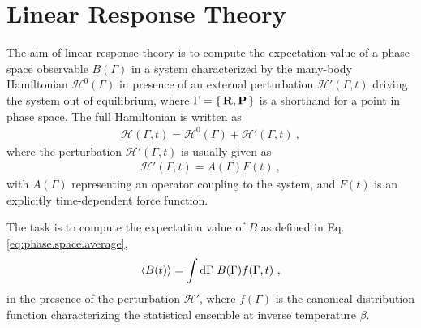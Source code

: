 \section{Linear Response Theory}
The aim of linear response theory is to compute the expectation value of a phase-space observable $B (\Gamma)$ in a system characterized by the many-body Hamiltonian $\mathcal H^0 (\Gamma)$ in presence of an external perturbation $\mathcal H' (\Gamma, t)$ driving the system out of equilibrium, where $\Gamma = \set{{\bf R}, {\bf P}}$ is a shorthand for a point in phase space.
The full Hamiltonian is written as
\begin{align}
  \mathcal H (\Gamma, t)
   = \mathcal H^0 (\Gamma) + \mathcal H' (\Gamma, t)~,
  \label{eq:lr.H}
\end{align}
where the perturbation $\mathcal H' (\Gamma, t)$ is usually given as
%
\begin{align}
  \mathcal H' (\Gamma, t)= A (\Gamma) F(t)~,
  \label{eq:lr.H_AF}
\end{align}
%
with $A(\Gamma)$ representing an operator coupling to the system, and $F(t)$ is an explicitly time-dependent force function.

The task is to compute the expectation value of $B$ as defined in Eq.\,\eqref{eq:phase.space.average},
%
\begin{align}
  \braket{B (t)}
    = \int \d \Gamma ~ B (\Gamma) f(\Gamma, t)~,
  \label{eq:lr.B.1}
\end{align}
%
in the presence of the perturbation $\mathcal H'$, where $f (\Gamma)$ is the canonical distribution function characterizing the statistical ensemble at inverse temperature $\beta$.

